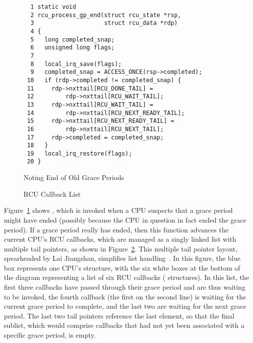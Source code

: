 \begin{figure}[tbp]
{ \scriptsize
\begin{verbatim}
  1 static void
  2 rcu_process_gp_end(struct rcu_state *rsp,
  3                    struct rcu_data *rdp)
  4 {
  5   long completed_snap;
  6   unsigned long flags;
  7
  8   local_irq_save(flags);
  9   completed_snap = ACCESS_ONCE(rsp->completed);
 10   if (rdp->completed != completed_snap) {
 11     rdp->nxttail[RCU_DONE_TAIL] =
 12         rdp->nxttail[RCU_WAIT_TAIL];
 13     rdp->nxttail[RCU_WAIT_TAIL] =
 14         rdp->nxttail[RCU_NEXT_READY_TAIL];
 15     rdp->nxttail[RCU_NEXT_READY_TAIL] =
 16         rdp->nxttail[RCU_NEXT_TAIL];
 17     rdp->completed = completed_snap;
 18   }
 19   local_irq_restore(flags);
 20 }
\end{verbatim}
}
\caption{Noting End of Old Grace Periods}
\label{fig:app:rcuimpl:rcutreewt:Noting End of Old Grace Periods}
\end{figure}

\begin{figure}[tb]
\centering
{}
\caption{RCU Callback List}
\label{fig:app:rcuimpl:rcutree:RCU Callback List}
\end{figure}

Figure~\ref{fig:app:rcuimpl:rcutreewt:Noting End of Old Grace Periods}
shows , which is invoked when a CPU suspects
that a grace period might have ended (possibly because the CPU in question
in fact ended the grace period).
If a grace period really has ended, then this function advances the
current CPU's RCU callbacks, which are managed as a singly linked
list with multiple tail pointers, as shown in
Figure~\ref{fig:app:rcuimpl:rcutree:RCU Callback List}.
This multiple tail pointer layout, spearheaded by
Lai Jiangshan, simplifies list
handling~\cite{LaiJiangshan2008NewClassicAlgorithm}.
In this figure, the blue box represents one CPU's 
structure, with the six white boxes at the bottom of the diagram
representing a list of six RCU callbacks ( structures).
In this list, the first three callbacks have passed through their
grace period and are thus waiting to be invoked, the fourth
callback (the first on the second line) is waiting for the current
grace period to complete, and the last two are waiting for the
next grace period.
The last two tail pointers reference the last element, so that the
final sublist, which would comprise callbacks that had not yet been
associated with a specific grace period, is empty.

